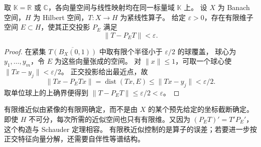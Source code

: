 \begin{proposition}\label{b1:prop:C1-hilbert-finite-rank}
取 \(\mathbb K=\mathbb R\) 或 \(\mathbb C\)，各向量空间与线性映射均在同一标量域 \(\mathbb K\) 上。
设 \(X\) 为 Banach 空间，\(H\) 为 Hilbert 空间，\(T:X\rightarrow H\) 为紧线性算子。
给定 \(\varepsilon>0\)，存在有限维子空间 \(E\subset H\)，使其正交投影 \(P_E\) 满足
\[
 \|T-P_ET\|<\varepsilon.
\]
\end{proposition}
\begin{proof}
在紧集 \(\overline{T(B_X(0,1))}\) 中取有限个半径小于 \(\varepsilon/2\) 的球覆盖，
球心为 \(y_1,\ldots,y_m\)，令 \(E\) 为这些向量张成的空间。
对 \(\|x\|\leq1\)，可取一个球心使 \(\|Tx-y_j\|<\varepsilon/2\)。
正交投影给出最近点，故
\[
 \|Tx-P_ETx\|=\operatorname{dist}(Tx,E)
 \leq\|Tx-y_j\|<\varepsilon/2.
\]
取单位球上的上确界便得到
\(\|T-P_ET\|\leq\varepsilon/2<\varepsilon\)。
\end{proof}

有限维近似由紧像的有限网确定，而不是由 \(X\) 的某个预先给定的坐标截断确定。
即使 \(H\) 不可分，每次所需的近似空间也只有有限维。又因为
\((P_ET)'=T'P_E'\)，这个构造与 Schauder 定理相容。
有限秩近似控制的是算子的误差；若要进一步按正交特征向量分解，还需要自伴性等谱结构。
